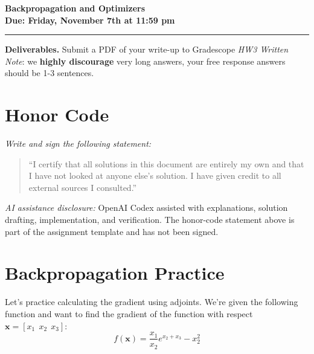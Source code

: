 \documentclass[11pt]{article}
\begin{document}
\begin{center}
    {\huge\bfseries Backpropagation and Optimizers}\\[6pt]
    \textbf{Due: Friday, November 7th at 11:59 pm}\\
\end{center}

\vspace{0.5em}\hrule\vspace{1em}

\noindent\textbf{Deliverables.} Submit a PDF of your write-up to Gradescope \emph{HW3 Written} \\
\noindent \textit{Note}: we \textbf{highly discourage} very long answers, your free response answers should be 1-3 sentences.

\section*{Honor Code}

\noindent\emph{Write and sign the following statement:}

\begin{quote}\small
“I certify that all solutions in this document are entirely my own and that I have
not looked at anyone else’s solution. I have given credit to all external
sources I consulted.”
\end{quote}

\par\smallskip
\noindent\textit{AI assistance disclosure:} OpenAI Codex assisted with explanations,
solution drafting, implementation, and verification. The honor-code statement above
is part of the assignment template and has not been signed.

\newpage

\section*{Backpropagation Practice}
Let's practice calculating the gradient using adjoints. We're given the following function and want to find the gradient of the function with respect $\textbf{x} = [x_1 \ \ x_2 \ \ x_3]$:
\[
f(\textbf{x}) = \frac{x_1}{x_2}e^{x_2 + x_3} - x_2^2
\]
\end{document}

